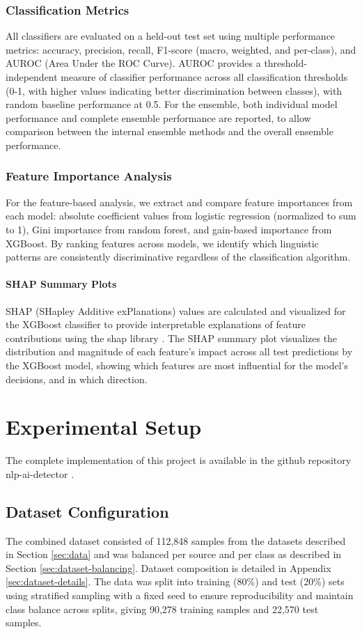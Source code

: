 \documentclass[11pt]{article}
\begin{document}
\subsubsection{Classification Metrics} All classifiers are evaluated on a held-out test set using multiple performance metrics: accuracy, precision, recall, F1-score (macro, weighted, and per-class), and AUROC (Area Under the ROC Curve). AUROC provides a threshold-independent measure of classifier performance across all classification thresholds (0-1, with higher values indicating better discrimination between classes), with random baseline performance at 0.5. For the ensemble, both individual model performance and complete ensemble performance are reported, to allow comparison between the internal ensemble methods and the overall ensemble performance.

\subsubsection{Feature Importance Analysis} For the feature-based analysis, we extract and compare feature importances from each model: absolute coefficient values from logistic regression (normalized to sum to 1), Gini importance from random forest, and gain-based importance from XGBoost. By ranking features across models, we identify which linguistic patterns are consistently discriminative regardless of the classification algorithm.

\paragraph{SHAP Summary Plots}
SHAP (SHapley Additive exPlanations) values are calculated and visualized for the XGBoost classifier to provide interpretable explanations of feature contributions using the shap library \citep{shap_library}. The SHAP summary plot visualizes the distribution and magnitude of each feature's impact across all test predictions by the XGBoost model, showing which features are most influential for the model's decisions, and in which direction.

\section{Experimental Setup}
\label{sec:experiment-setup}
The complete implementation of this project is available in the github repository nlp-ai-detector \citep{githubrepository}.

\subsection{Dataset Configuration}
The combined dataset consisted of 112,848 samples from the datasets described in Section \ref{sec:data} and was balanced per source and per class as described in Section \ref{sec:dataset-balancing}. Dataset composition is detailed in Appendix \ref{sec:dataset-details}. The data was split into training (80\%) and test (20\%) sets using stratified sampling with a fixed seed to ensure reproducibility and maintain class balance across splits, giving 90,278 training samples and 22,570 test samples.
\end{document}
